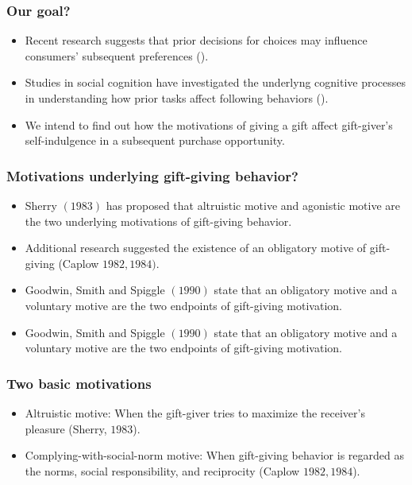 \documentclass[11pt]{beamer}
\begin{document}
\begin{frame}[t]
\frametitle{Our goal?}
\begin{itemize}
\item<+-> Recent research suggests that prior decisions for choices may influence consumers' subsequent preferences (\cite{Khan2006}).
\item<+-> Studies in social cognition have investigated the underlyng cognitive processes in understanding how prior tasks affect following behaviors (\cite{demarree2005}).
\item<+-> We intend to find out how the motivations of giving a gift affect gift-giver's self-indulgence in a subsequent purchase opportunity.
\end{itemize}
\note{~}
\end{frame}



\begin{frame}[t]
\frametitle{Motivations underlying gift-giving behavior?}
\begin{itemize}
\item<+-> Sherry $(1983)$ has proposed that altruistic motive and agonistic motive are the two underlying motivations of gift-giving behavior.
\item<+-> Additional research suggested the existence of an obligatory motive of gift-giving (Caplow $1982, 1984)$.
\item<+-> Goodwin, Smith and Spiggle $(1990)$ state that an obligatory motive and a voluntary motive are the two endpoints of gift-giving motivation.
\item<+-> Goodwin, Smith and Spiggle $(1990)$ state that an obligatory motive and a voluntary motive are the two endpoints of gift-giving motivation.
\end{itemize}
\note{~}
\end{frame}


\begin{frame}[t]
\frametitle{Two basic motivations}
\begin{itemize}
\item<+-> Altruistic motive: When the gift-giver tries to maximize the receiver’s pleasure (Sherry, $1983$).
\item<+-> Complying-with-social-norm motive: When gift-giving behavior is regarded as the norms, social responsibility, and reciprocity (Caplow $1982, 1984$).
\end{itemize}
\note{~}
\end{frame}
\end{document}
